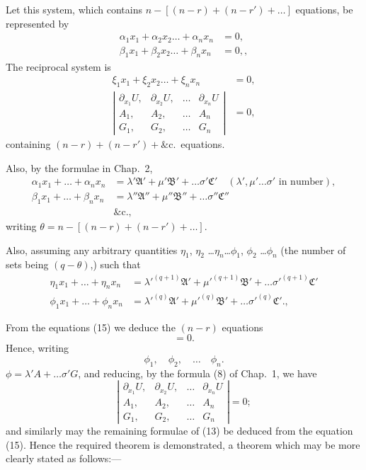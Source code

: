 \documentclass[11pt,a4paper]{article}
\theoremstyle{plain}
\theoremstyle{definition}
\theoremstyle{remark}
\begin{document}
Let this system, which contains $n - [(n-r) + (n-r') + \ldots]$ equations, be represented by
\begin{align*}
\alpha_1 x_1 + \alpha_2 x_2 \ldots + \alpha_n x_n &= 0, \\
\beta_1 x_1 + \beta_2 x_2 \ldots + \beta_n x_n &= 0,
\tag{14},
\end{align*}
The reciprocal system is
\begin{align*}
\xi_1 x_1 + \xi_2 x_2 \ldots + \xi_n x_n &= 0, \\
\left|\begin{array}{cccc}
\partial_{x_1} U, & \partial_{x_2} U, & \ldots & \partial_{x_n} U \\
A_1, & A_2, & \ldots & A_n \\
G_1, & G_2, & \ldots & G_n
\end{array}\right| &= 0
\tag{15},
\end{align*}
containing $(n-r) + (n-r') + \&$c.\ equations.

Also, by the formulae in Chap.\ 2,
\begin{align*}
\alpha_1 x_1 + \ldots + \alpha_n x_n &= \lambda' \mathfrak{A}' + \mu' \mathfrak{B}' + \ldots \sigma' \mathfrak{C}' \quad (\lambda', \mu' \ldots \sigma' \text{ in number}), \\
\beta_1 x_1 + \ldots + \beta_n x_n &= \lambda'' \mathfrak{A}'' + \mu'' \mathfrak{B}'' + \ldots \sigma'' \mathfrak{C}'' \\
&\text{\&c.} \tag{16},
\end{align*}
writing $\theta = n - [(n-r) + (n-r') + \ldots]$.

Also, assuming any arbitrary quantities $\eta_1$, $\eta_2$ \ldots $\eta_n$\ldots $\phi_1$, $\phi_2$ \ldots $\phi_n$ (the number of
sets being $(q-\theta)$,) such that
\begin{align*}
\eta_1 x_1 + \ldots + \eta_n x_n &= \lambda'^{(q+1)} \mathfrak{A}' + \mu'^{(q+1)} \mathfrak{B}' + \ldots \sigma'^{(q+1)} \mathfrak{C}' \\
\phi_1 x_1 + \ldots + \phi_n x_n &= \lambda'^{(q)} \mathfrak{A}' + \mu'^{(q)} \mathfrak{B}' + \ldots \sigma'^{(q)} \mathfrak{C}'.
\tag{17},
\end{align*}

From the equations (15) we deduce the $(n-r)$ equations
\[
= 0
\tag{18}.
\]
Hence, writing
\[
\phi_1, \quad \phi_2, \quad \ldots \quad \phi_n
\tag{19}.
\]
$\phi = \lambda' A + \ldots \sigma' G$,
and reducing, by the formula (8) of Chap.\ 1, we have
\[
\left|\begin{array}{ccccc}
\partial_{x_1} U, & \partial_{x_2} U, & \ldots & \partial_{x_n} U \\
A_1, & A_2, & \ldots & A_n \\
G_1, & G_2, & \ldots & G_n
\end{array}\right| = 0
\tag{20};
\]
and similarly may the remaining formulae of (13) be deduced from the equation (15).
Hence the required theorem is demonstrated, a theorem which may be more clearly
stated as follows:---
\end{document}
